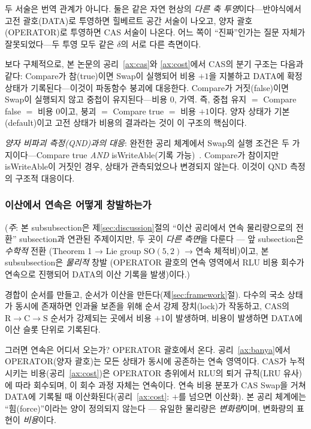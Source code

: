 \documentclass[entropy,article,submit,pdftex,oneauthor]{Definitions/mdpi}
\begin{document}
두 서술은 번역 관계가 아니다. 둘은 같은 자연 현상의 \emph{다른 축 투영}이다---반야식에서 고전 괄호(DATA)로 투영하면 힐베르트 공간 서술이 나오고, 양자 괄호(OPERATOR)로 투영하면 CAS 서술이 나온다. 어느 쪽이 ``진짜''인가는 질문 자체가 잘못되었다---두 투영 모두 같은 $\delta$의 서로 다른 측면이다.

보다 구체적으로, 본 논문의 공리~\ref{ax:cas}와 \ref{ax:cost}에서 CAS의 분기 구조는 다음과 같다: Compare가 참(true)이면 Swap이 실행되어 비용 $+1$을 지불하고 DATA에 확정 상태가 기록된다---이것이 파동함수 붕괴에 대응한다. Compare가 거짓(false)이면 Swap이 실행되지 않고 중첩이 유지된다---비용 $0$, 가역. 즉, 중첩 유지 $=$ Compare false $=$ 비용 $0$이고, 붕괴 $=$ Compare true $=$ 비용 $+1$이다. 양자 상태가 기본(default)이고 고전 상태가 비용의 결과라는 것이 이 구조의 핵심이다.

\emph{양자 비파괴 측정(QND)과의 대응}: 완전한 공리 체계에서 Swap의 실행 조건은 두 가지이다---Compare true \emph{AND} isWriteAble(기록 가능)~\cite{han2026}. Compare가 참이지만 isWriteAble이 거짓인 경우, 상태가 관측되었으나 변경되지 않는다. 이것이 QND 측정의 구조적 대응이다.

\subsubsection{이산에서 연속은 어떻게 창발하는가}

(\emph{주}: 본 subsubsection은 제\ref{sec:discussion}절의 ``이산 공리에서 연속 물리량으로의 전환'' subsection과 연관된 주제이지만, 두 곳이 \emph{다른 측면}을 다룬다 — 앞 subsection은 \emph{수학적} 전환 (Theorem 1 → Lie group $\mathrm{SO}(5,2)$ → 연속 체적비)이고, 본 subsubsection은 \emph{물리적} 창발 (OPERATOR 괄호의 연속 영역에서 RLU 비용 회수가 연속으로 진행되어 DATA의 이산 기록을 발생)이다.)

경합이 순서를 만들고, 순서가 이산을 만든다(제\ref{sec:framework}절). 다수의 국소 상태가 동시에 존재하면 인과율 보존을 위해 순서 강제 장치(lock)가 작동하고, CAS의 $\mathrm{R} \to \mathrm{C} \to \mathrm{S}$ 순서가 강제되는 곳에서 비용 $+1$이 발생하며, 비용이 발생하면 DATA에 이산 슬롯 단위로 기록된다.

그러면 연속은 어디서 오는가? OPERATOR 괄호에서 온다. 공리~\ref{ax:banya}에서 OPERATOR(양자 괄호)는 모든 상태가 동시에 공존하는 연속 영역이다. CAS가 누적시키는 비용(공리~\ref{ax:cost})은 OPERATOR 층위에서 RLU의 퇴거 규칙(LRU 유사)에 따라 회수되며, 이 회수 과정 자체는 연속이다. 연속 비용 분포가 CAS Swap을 거쳐 DATA에 기록될 때 이산화된다(공리~\ref{ax:cost}: $+$를 넘으면 이산화). 본 공리 체계에는 ``힘(force)''이라는 양이 정의되지 않는다 — 유일한 물리량은 \emph{변화량}이며, 변화량의 표현이 \emph{비용}이다.
\end{document}
